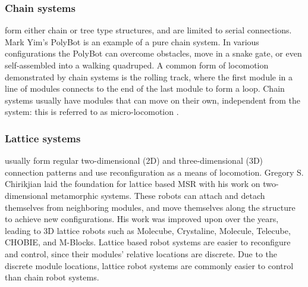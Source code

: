 \documentclass[letterpaper, 10 pt, conference]{ieeeconf}  %
\begin{document}
\subsubsection{Chain systems} form either chain or tree type structures, and are limited to serial connections. Mark Yim's PolyBot is an example of a pure chain system\cite{Yim2000}. In various configurations the PolyBot can overcome obstacles, move in a snake gate, or even self-assembled into a walking quadruped. A common form of locomotion demonstrated by chain systems is the rolling track, where the first module in a line of modules connects to the end of the last module to form a loop\cite{Yim2000, Murata2002, SuperBotLocomotion, Baca2014}. Chain systems usually have modules that can move on their own, independent from the system: this is referred to as micro-locomotion \cite{Gilpin2010}.

\subsubsection{Lattice systems} usually form regular two-dimensional (2D) and three-dimensional (3D) connection patterns and use reconfiguration as a means of locomotion\cite{Yim2007}. Gregory S. Chirikjian laid the foundation for lattice based MSR with his work on two-dimensional metamorphic systems\cite{Chirikjian1994, Chirikjian1996}. These robots can attach and detach themselves from neighboring modules, and move themselves along the structure to achieve new configurations. His work was improved upon over the years, leading to 3D lattice robots such as Molecube, Crystaline, Molecule, Telecube, CHOBIE, and M-Blocks\cite{Yim2009MSRR, Aloupis2013}. Lattice based robot systems are easier to reconfigure and control, since their modules' relative locations are discrete. Due to the discrete module locations, lattice robot systems are commonly easier to control than chain robot systems.
\end{document}
